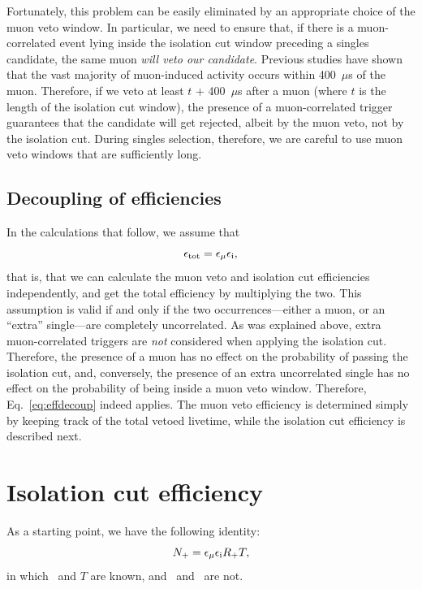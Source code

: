 \documentclass[../thesis.tex]{subfiles}
\begin{document}
Fortunately, this problem can be easily eliminated by an appropriate choice of the muon veto window. In particular, we need to ensure that, if there is a muon-correlated event lying inside the isolation cut window preceding a singles candidate, the same muon \emph{will veto our candidate}. Previous studies have shown that the vast majority of muon-induced activity occurs within 400~$\mu$s of the muon. Therefore, if we veto at least $t$ + 400~$\mu$s after a muon (where $t$ is the length of the isolation cut window), the presence of a muon-correlated trigger guarantees that the candidate will get rejected, albeit by the muon veto, not by the isolation cut. During singles selection, therefore, we are careful to use muon veto windows that are sufficiently long.

\subsection{Decoupling of efficiencies}

In the calculations that follow, we assume that
\begin{equation}
  \label{eq:effdecoup}
  \epsilon_\mathrm{tot} = \epsilon_\mathrm{\mu} \epsilon_\mathrm{i},
\end{equation}
that is, that we can calculate the muon veto and isolation cut efficiencies independently, and get the total efficiency by multiplying the two. This assumption is valid if and only if the two occurrences---either a muon, or an ``extra'' single---are completely uncorrelated. As was explained above, extra muon-correlated triggers are \emph{not} considered when applying the isolation cut. Therefore, the presence of a muon has no effect on the probability of passing the isolation cut, and, conversely, the presence of an extra uncorrelated single has no effect on the probability of being inside a muon veto window. Therefore, Eq.~\ref{eq:effdecoup} indeed applies. The muon veto efficiency is determined simply by keeping track of the total vetoed livetime, while the isolation cut efficiency is described next.


\section{Isolation cut efficiency}
\label{sec:isolcuteff}

As a starting point, we have the following identity:
\begin{equation}
  \label{eq:ident0}
  N_\mathrm{+} = \epsilon_\mathrm{\mu} \epsilon_\mathrm{i} R_\mathrm{+} T,
\end{equation}
in which \emu\ and $T$ are known, and \eisol\ and \Rplu\ are not.
\end{document}
